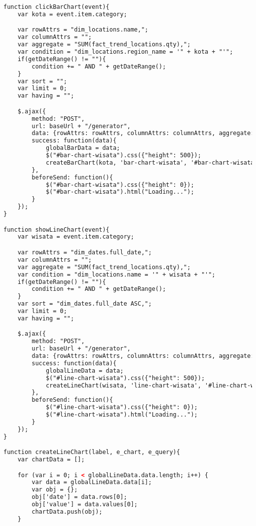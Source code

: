 \begin{lstlisting}[language=HTML,basicstyle=\tiny,caption=script-dashboard.js]
function clickBarChart(event){
    var kota = event.item.category;

    var rowAttrs = "dim_locations.name,";
    var columnAttrs = "";
    var aggregate = "SUM(fact_trend_locations.qty),";
    var condition = "dim_locations.region_name = '" + kota + "'";
    if(getDateRange() != ""){
        condition += " AND " + getDateRange();
    }
    var sort = "";
    var limit = 0;
    var having = "";

    $.ajax({
        method: "POST",
        url: baseUrl + "/generator",
        data: {rowAttrs: rowAttrs, columnAttrs: columnAttrs, aggregate: aggregate, condition: condition, sort: sort, limit: limit, having: having, connectionId: 0, cubeId: 0},
        success: function(data){
            globalBarData = data;
            $("#bar-chart-wisata").css({"height": 500});
            createBarChart(kota, 'bar-chart-wisata', '#bar-chart-wisata-query-time', showLineChart);
        },
        beforeSend: function(){
            $("#bar-chart-wisata").css({"height": 0});
            $("#bar-chart-wisata").html("Loading...");
        }
    });
}

function showLineChart(event){
    var wisata = event.item.category;

    var rowAttrs = "dim_dates.full_date,";
    var columnAttrs = "";
    var aggregate = "SUM(fact_trend_locations.qty),";
    var condition = "dim_locations.name = '" + wisata + "'";
    if(getDateRange() != ""){
        condition += " AND " + getDateRange();
    }
    var sort = "dim_dates.full_date ASC,";
    var limit = 0;
    var having = "";

    $.ajax({
        method: "POST",
        url: baseUrl + "/generator",
        data: {rowAttrs: rowAttrs, columnAttrs: columnAttrs, aggregate: aggregate, condition: condition, sort: sort, limit: limit, having: having, connectionId: 0, cubeId: 0},
        success: function(data){
            globalLineData = data;
            $("#line-chart-wisata").css({"height": 500});
            createLineChart(wisata, 'line-chart-wisata', '#line-chart-wisata-query-time');
        },
        beforeSend: function(){
            $("#line-chart-wisata").css({"height": 0});
            $("#line-chart-wisata").html("Loading...");
        }
    });
}

function createLineChart(label, e_chart, e_query){
    var chartData = [];

    for (var i = 0; i < globalLineData.data.length; i++) {
        var data = globalLineData.data[i];
        var obj = {};
        obj['date'] = data.rows[0];
        obj['value'] = data.values[0];
        chartData.push(obj);
    }


\end{lstlisting}

